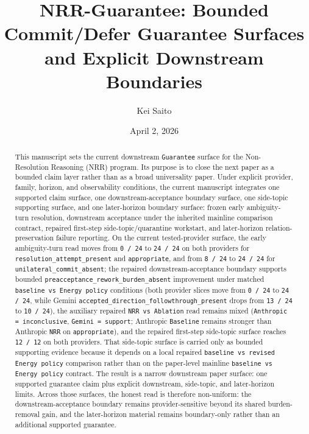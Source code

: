 \documentclass[11pt]{article}
\title{NRR-Guarantee: Bounded Commit/Defer Guarantee Surfaces and Explicit Downstream Boundaries}
\author{Kei Saito}
\date{April 2, 2026}
\begin{document}
\maketitle

\begin{abstract}
This manuscript sets the current downstream \texttt{Guarantee} surface for the
Non-Resolution Reasoning (NRR) program. Its purpose is to close the next paper
as a bounded claim layer rather than as a broad universality paper. Under
explicit provider, family, horizon, and observability conditions, the current
manuscript integrates one supported claim surface, one downstream-acceptance
boundary surface, one side-topic supporting surface, and one later-horizon
boundary surface: frozen early ambiguity-turn resolution, downstream
acceptance under the inherited mainline comparison contract, repaired
first-step side-topic/quarantine workstart, and later-horizon
relation-preservation failure reporting. On the current tested-provider
surface, the early ambiguity-turn read moves from \texttt{0 / 24} to
\texttt{24 / 24} on both providers for
\texttt{resolution\_attempt\_present} and \texttt{appropriate}, and from
\texttt{8 / 24} to \texttt{24 / 24} for
\texttt{unilateral\_commit\_absent}; the repaired downstream-acceptance boundary supports bounded
\texttt{preacceptance\_rework\_burden\_absent} improvement under matched
\texttt{baseline vs Energy policy} conditions (both provider slices move from
\texttt{0 / 24} to \texttt{24 / 24}, while Gemini
\texttt{accepted\_direction\_followthrough\_present} drops from
\texttt{13 / 24} to \texttt{10 / 24}), the auxiliary repaired
\texttt{NRR vs Ablation} read remains mixed
(\texttt{Anthropic = inconclusive}, \texttt{Gemini = support}; Anthropic
\texttt{Baseline} remains stronger than Anthropic \texttt{NRR} on
\texttt{appropriate}), and the
repaired first-step side-topic surface reaches \texttt{12 / 12} on both
providers. That side-topic surface is carried only as bounded supporting
evidence because it depends on a local repaired
\texttt{baseline vs revised Energy policy} comparison rather than on the
paper-level mainline \texttt{baseline vs Energy policy} contract. The result is
a narrow downstream paper surface: one supported guarantee claim plus explicit
downstream, side-topic, and later-horizon limits. Across those surfaces, the
honest read is therefore non-uniform: the
downstream-acceptance boundary remains provider-sensitive beyond its shared
burden-removal gain, and the later-horizon material remains boundary-only
rather than an additional supported guarantee.
\end{abstract}
\end{document}
